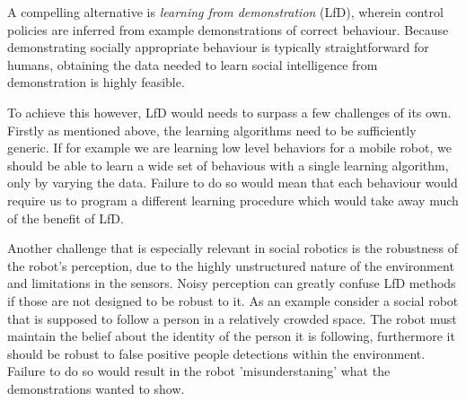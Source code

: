 \documentclass[letterpaper, 10 pt, conference]{ieeeconf}
\begin{document}

A compelling alternative is \emph{learning from demonstration} (LfD), wherein control policies are inferred from example demonstrations of correct behaviour.  Because demonstrating socially appropriate behaviour is typically straightforward for humans, obtaining the data needed to learn social intelligence from demonstration is highly feasible.


To achieve this however, LfD would needs to surpass a few challenges of its own. Firstly as mentioned above, the learning algorithms need to be sufficiently generic. If for example we are learning low level behaviors for a mobile robot, we should be able to learn a wide set of behavious with a single learning algorithm, only by varying the data. Failure to do so would mean that each behaviour would require us to program a different learning procedure which would take away much of the benefit of LfD. 

Another challenge that is especially relevant in social robotics is the robustness of the robot's perception, due to the highly unstructured nature of the environment and limitations in the sensors. Noisy perception can greatly confuse LfD methods if those are not designed to be robust to it. As an example consider a social robot that is supposed to follow a person in a relatively crowded space. The robot must maintain the belief about the identity of the person it is following, furthermore it should be robust to false positive people detections within the environment. Failure to do so would result in the robot 'misunderstaning' what the demonstrations wanted to show.
\end{document}
